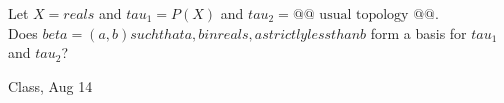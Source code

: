 \begin{samepage}
\begin{ex}
    Let $X = reals$ and $tau_1 = P(X)$ and $tau_2 = @@\text{ usual topology }@@$. \\
    Does $beta = {{ (a,b) such that a,b in reals, a strictly less than b }}$ form a basis for $tau_1$ and $tau_2$?
\end{ex}
\begin{source}
    Class, Aug 14
\end{source}
\end{samepage}
